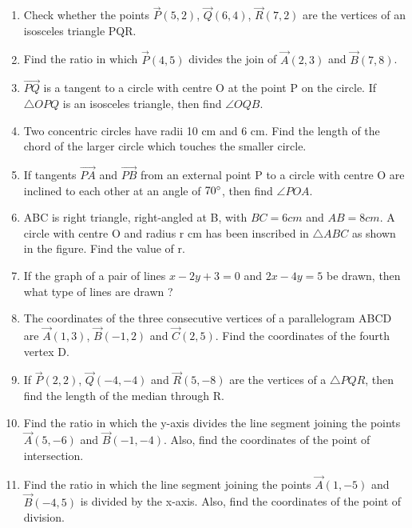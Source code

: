 \documentclass{article}
\begin{document}
\begin{enumerate}
\item Check whether the points $\vec{P}(5, 2)$, $\vec{Q}(6, 4)$, $\vec{R}(7, 2)$ are the vertices of an isosceles triangle PQR.

\item Find the ratio in which $\vec{P}(4, 5)$ divides the join of $\vec{A}(2, 3)$ and $\vec{B}(7, 8)$. 
	
\item $ \vec{PQ} $ is a tangent to a circle with centre O at the point P on the circle. If $\triangle OPQ$ is an isosceles triangle, then find $\angle OQB$. 

\item Two concentric circles have radii 10 cm and 6 cm. Find the length of the chord of the larger circle which touches the smaller circle. 

\item If tangents $ \vec{PA} $ and $ \vec{PB} $ from an external point P to a circle with centre O are inclined to each other at an angle of $70\degree$, then find $\angle POA$. 

\item ABC is right triangle, right-angled at B, with $BC = 6 cm$ and $AB = 8 cm$. A circle with centre O and radius r cm has been inscribed in $\triangle ABC$ as shown in the figure. Find the value of r. 

\item If the graph of a pair of lines $x - 2y + 3 = 0$ and $2x - 4y = 5$ be drawn, then what type of lines are drawn ? 
  
\item The coordinates of the three consecutive vertices of a parallelogram ABCD are $\vec{A}(1, 3)$, $\vec{B}(-1, 2)$ and $\vec{C}(2, 5)$. Find the coordinates of the fourth vertex D. 

\item If $\vec{P}(2, 2)$, $\vec{Q}(-4, -4)$ and $\vec{R}(5, -8)$ are the vertices of a  $\triangle PQR$, then find the length of the median through R.

\item Find the ratio in which the y-axis divides the line segment joining the points $\vec{A}(5, -6)$ and $\vec{B}(-1, -4)$. Also, find the coordinates of the point of intersection.

\item Find the ratio in which the line segment joining the points $\vec{A}(1, -5)$ and $\vec{B}(-4, 5)$ is divided by the x-axis. Also, find the coordinates of the point of division.
   

\end{enumerate}
\end{document}
